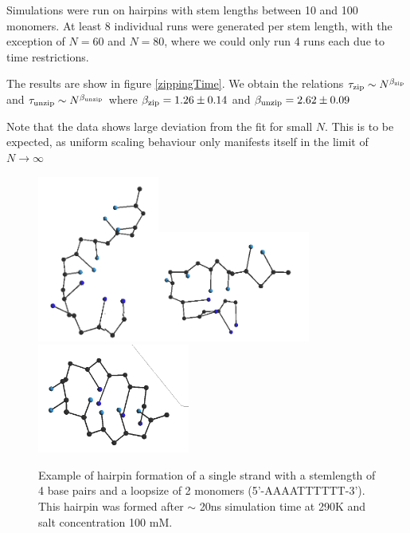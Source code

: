 Simulations were run on hairpins with stem lengths between 10 and 100 monomers. At least 8 individual runs were generated per stem length, with the exception of $N = 60$ and $N = 80$, where we could only run 4 runs each due to time restrictions.

The results are show in figure \ref{zippingTime}. We obtain the relations ${\tau_\text{zip}} \sim N^{\beta_\text{zip}}$ and ${\tau_\text{unzip}} \sim N^{\beta_\text{unzip}}$ where ${\beta_\text{zip}} = 1.26 \pm 0.14$ and ${\beta_\text{unzip}} = 2.62 \pm 0.09$

Note that the data shows large deviation from the fit for small $N$. This is to be expected, as uniform scaling behaviour only manifests itself in the limit of $N \to \infty$


\begin{figure}[hbt]
\begin{center}
\includegraphics[width=4cm]{images/results_hairpin1}\includegraphics[width=5cm]{images/results_hairpin2}\includegraphics[width=5cm]{images/results_hairpin3}
\end{center}
\caption{Example of hairpin formation of a single strand with a stemlength of 4 base pairs and a loopsize of 2 monomers (5'-AAAATTTTTT-3'). This hairpin was formed after $\sim$ 20ns simulation time at 290K and salt concentration 100 mM.}
\label{results_hairpin}
\end{figure}




